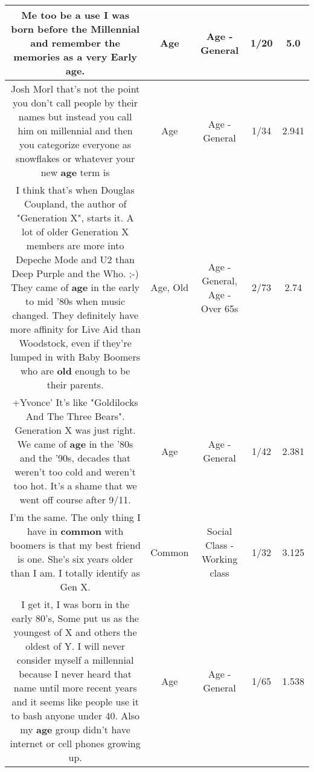 \documentclass[11pt]{article}
\newlength\mylength
\begin{document}
\begin{center}
\begin{longtable}{|C{.65\mylength}|C{.30\mylength}|C{.12\mylength}|C{.12\mylength}|C{.12\mylength}|}
  \small Me too be a use I was born before the Millennial and remember the memories as a very Early \textbf{age}.\normalsize   & Age & Age - General & 1/20 & 5.0 \\  \hline
  \small Josh Morl that's not the point you don't call people by their names but instead you call him on millennial and then you categorize everyone as snowflakes or whatever your new \textbf{age} term is\normalsize   & Age & Age - General & 1/34 & 2.941 \\  \hline
  \small I think that's when Douglas Coupland, the author of "Generation X", starts it. A lot of older Generation X members are more into Depeche Mode and U2 than Deep Purple and the Who. ;-) They came of \textbf{age} in the early to mid '80s when music changed. They definitely have more affinity for Live Aid than Woodstock, even if they're lumped in with Baby Boomers who are \textbf{old} enough to be their parents.\normalsize   & Age, Old & Age - General, Age - Over 65s & 2/73 & 2.74 \\  \hline
  \small +Yvonce' It's like "Goldilocks And The Three Bears". Generation X was just right. We came of \textbf{age} in the '80s and the '90s, decades that weren't too cold and weren't too hot. It's a shame that we went off course after 9/11.\normalsize   & Age & Age - General & 1/42 & 2.381 \\  \hline
  \small I'm the same. The only thing I have in \textbf{common} with boomers is that my best friend is one. She's six years older than I am. I totally identify as Gen X.\normalsize   & Common & Social Class - Working class & 1/32 & 3.125 \\  \hline
  \small I get it, I was born in the early 80's, Some put us as the youngest of X and others the oldest of Y. I will never consider myself a millennial because I never heard that name until more recent years and it seems like people use it to bash anyone under 40. Also my \textbf{age} group didn't have internet or cell phones growing up.\normalsize   & Age & Age - General & 1/65 & 1.538 \\  \hline

\end{longtable}
\end{center}
\end{document}
